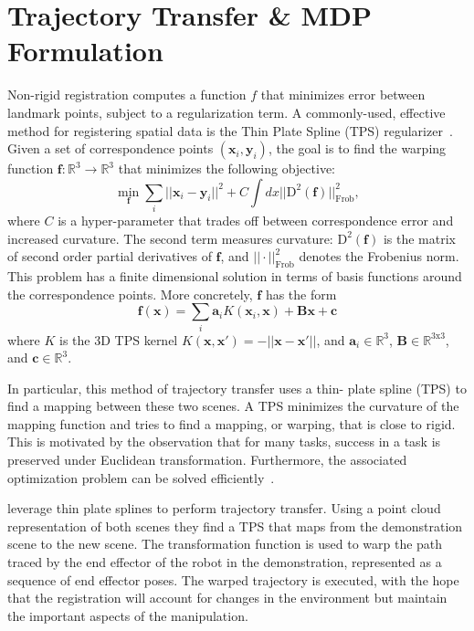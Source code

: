 \documentclass[conference]{IEEEtran}
\begin{document}
\section{Trajectory Transfer \& MDP Formulation}

Non-rigid registration computes a function $f$ that minimizes error
between landmark points, subject to a regularization term.  A
commonly-used, effective method for registering spatial data is the
Thin Plate Spline (TPS) regularizer~\citep{Carr_SIGGRAPH2001,
  Wahba_TPS1990}.  Given a set of correspondence points
$(\mathbf{x}_i, \mathbf{y}_i)$, the goal is to find the warping
function $\mathbf{f} : \mathbb{R}^3 \rightarrow \mathbb{R}^3$ that
minimizes the following objective:
$$\min_{\mathbf{f}} \sum_i ||\mathbf{x}_i - \mathbf{y}_i||^2 + C\int
dx ||\text{D}^2(\mathbf{f})||^2_{\text{Frob}},$$ where $C$ is a
hyper-parameter that trades off between correspondence error and
increased curvature.  The second term measures curvature:
$\text{D}^2(\mathbf{f})$ is the matrix of second order partial
derivatives of $\mathbf{f}$, and $||\cdot||^2_{\text{Frob}}$ denotes
the Frobenius norm.  This problem has a finite dimensional solution in
terms of basis functions around the correspondence points.  More
concretely, $\mathbf{f}$ has the form
$$\mathbf{f}(\mathbf{x}) = \sum_i \mathbf{a}_i K(\mathbf{x}_i, \mathbf{x}) + \mathbf{B}\mathbf{x} + \mathbf{c}$$
where $K$ is the 3D TPS kernel $K(\mathbf{x}, \mathbf{x}') = - ||\mathbf{x} - \mathbf{x}'||$, and $\mathbf{a}_i \in \mathbb{R}^3$, $\mathbf{B} \in \mathbb{R}^{3\text{x}3}$, and $\mathbf{c} \in \mathbb{R}^3$.



In particular, this method of trajectory transfer uses a thin- plate
spline (TPS) to find a mapping between these two scenes. A TPS
minimizes the curvature of the mapping function and tries to find a
mapping, or warping, that is close to rigid. This is motivated by the
observation that for many tasks, success in a task is preserved under
Euclidean transformation. Furthermore, the associated optimization
problem can be solved efficiently~\citep{Wahba_TPS1990}.

\citet{Schulmanetal_ISRR2013} leverage thin plate splines to perform
trajectory transfer.  Using a point cloud representation of both
scenes they find a TPS that maps from the demonstration scene to the
new scene.  The transformation function is used to warp the path
traced by the end effector of the robot in the demonstration,
represented as a sequence of end effector poses. The warped trajectory
is executed, with the hope that the registration will account for
changes in the environment but maintain the important aspects of the
manipulation.
\end{document}

